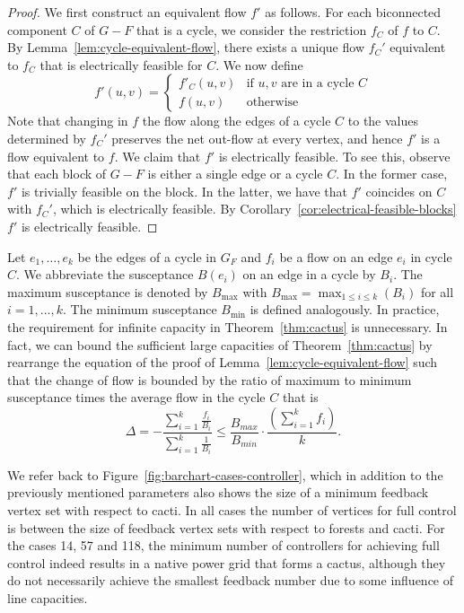 \documentclass{article}[11pt,a4paper]
\begin{document}
\begin{proof}
  We first construct an equivalent flow $f'$ as follows.  For each
  biconnected component $C$ of $G-F$ that is a cycle, we consider the
  restriction $f_C$ of $f$ to $C$.  By
  Lemma~\ref{lem:cycle-equivalent-flow}, there exists a unique
   flow $f_C'$ equivalent to $f_C$ that is electrically
  feasible for $C$.  We now define \[f'(u,v) =
  \begin{cases}
    f'_C(u,v) & \text{if } u,v \text{ are in a cycle } C\\
    f(u,v) & \text{otherwise}
  \end{cases}
\]
Note that changing in $f$ the flow along the edges of a cycle $C$ to
the values determined by $f_C'$ preserves the net out-flow at every
vertex, and hence $f'$ is a flow equivalent to $f$.  We claim that
$f'$ is electrically feasible.  To see this, observe that each block
of $G-F$ is either a single edge or a cycle $C$.  In the former case,
$f'$ is trivially feasible on the block.  In the latter, we have that
$f'$ coincides on $C$ with $f_C'$, which is electrically feasible.  By
Corollary~\ref{cor:electrical-feasible-blocks} $f'$ is electrically
feasible.
\end{proof}
Let $e_1, \dots, e_k$ be the edges of a cycle in $G_F$ and $f_i$ be a flow on an edge $e_i$ in cycle $C$. 
We abbreviate the susceptance $B(e_i)$ on an edge in a cycle by $B_i$. The maximum susceptance is denoted by $B_{\max}$ with $B_{\max} = \max_{1\leq i\leq k}(B_i)$ for all $i = 1, \dots, k$. 
The minimum susceptance $B_{\min}$ is defined analogously.
In practice, the requirement for infinite capacity in Theorem~\ref{thm:cactus} is unnecessary. In fact, we 
can bound the sufficient large capacities of Theorem~\ref{thm:cactus} 
by rearrange the equation of the proof of Lemma~\ref{lem:cycle-equivalent-flow} 
such that the change of flow is bounded by the ratio of maximum to minimum susceptance times the average flow in the cycle $C$ that is
\[\Delta = -\frac{\sum_{i = 1}^{k} \frac{f_i}{B_i}}{\sum_{i=1}^{k} \frac{1}{B_i}}\leq\frac{B_{max}}{B_{min}}\cdot \frac{\left(\sum_{i = 1}^{k} f_i\right)}{k}.\] 

We refer back to Figure~\ref{fig:barchart-cases-controller}, which in
addition to the previously mentioned parameters also shows the size of
a minimum feedback vertex set with respect to cacti.  In all cases the
number of vertices for full control is between the size of feedback
vertex sets with respect to forests and cacti.  For the cases 14, 57
and 118, the minimum number of controllers for achieving full control
indeed results in a native power grid that forms a cactus, although
they do not necessarily achieve the smallest feedback number due to
some influence of line capacities.
\end{document}
